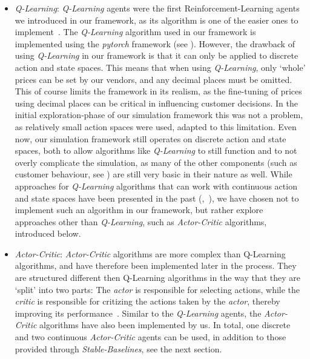 \begin{itemize}
	\item {}\emph{Q-Learning}:\label{item:QLearning} \emph{Q-Learning} agents were the first Reinforcement-Learning agents we introduced in our framework, as its algorithm is one of the easier ones to implement~\cite{reinforcementLearningOverview}. The \emph{Q-Learning} algorithm used in our framework is implemented using the \emph{pytorch} framework (see \cite{Pytorch}). However, the drawback of using \emph{Q-Learning} in our framework is that it can only be applied to discrete action and state spaces. This means that when using \emph{Q-Learning}, only `whole' prices can be set by our vendors, and any decimal places must be omitted. This of course limits the framework in its realism, as the fine-tuning of prices using decimal places can be critical in influencing customer decisions. In the initial exploration-phase of our simulation framework this was not a problem, as relatively small action spaces were used, adapted to this limitation. Even now, our simulation framework still operates on discrete action and state spaces, both to allow algorithms like \emph{Q-Learning} to still function and to not overly complicate the simulation, as many of the other components (such as customer behaviour, see ) are still very basic in their nature as well. While approaches for \emph{Q-Learning} algorithms that can work with continuous action and state spaces have been presented in the past (\cite{QLearningContinuous},~\cite{QLearningContinuous2}), we have chosen not to implement such an algorithm in our framework, but rather explore approaches other than \emph{Q-Learning}, such as \emph{Actor-Critic} algorithms, introduced below.

	\item {}\emph{Actor-Critic}:\label{item:ActorCritic} \emph{Actor-Critic} algorithms are more complex than Q-Learning algorithms, and have therefore been implemented later in the process. They are structured different then Q-Learning algorithms in the way that they are `split' into two parts: The \emph{actor} is responsible for selecting actions, while the \emph{critic} is responsible for critizing the actions taken by the \emph{actor}, thereby improving its performance~\cite{ActorCritic}. Similar to the \emph{Q-Learning} agents, the \emph{Actor-Critic} algorithms have also been implemented by us. In total, one discrete and two continuous \emph{Actor-Critic} agents can be used, in addition to those provided through \emph{Stable-Baselines}, see the next section.


\end{itemize}
